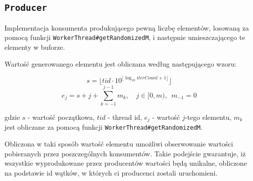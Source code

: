 \documentclass[11pt]{article}
\begin{document}
    \hypertarget{producer}{%
\subsection{\texorpdfstring{\texttt{Producer}}{Producer}}\label{producer}}

Implementacja konsumenta produkującego pewną liczbę elementów, losowaną
za pomocą funkcji \texttt{WorkerThread\#getRandomizedM}, i następnie
umieszczającego te elementy w buforze.

Wartość generowanego elementu jest obliczana według następującego wzoru:

\[ s = \lfloor tid \cdot 10^{\lfloor \log_{10}{iterCount} + 1 \rfloor} \rfloor \]
\[ e_j = s + j + \sum_{k=-1}^{j - 1} m_k, \quad j \in [0, m), \enspace m_{-1} = 0 \]

gdzie \(s\) - wartość początkowa, \(tid\) - thread id, \(e_j\) - wartość
\(j\)-tego elementu, \(m_k\) jest obliczane za pomocą funkcji
\texttt{WorkerThread\#getRandomizedM}.

Obliczona w taki sposób wartość elementu umożliwi obserwowanie wartości
pobieranych przez poszczególnych konsumentów. Takie podejście
gwarantuje, iż wszystkie wyprodukowane przez producentów wartości będą
unikalne, obliczone na podstawie id wątków, w których ci producenci
zostali uruchomieni.
\end{document}
